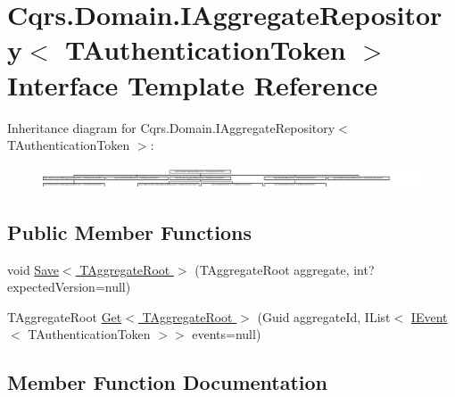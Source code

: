 \hypertarget{interfaceCqrs_1_1Domain_1_1IAggregateRepository}{}\section{Cqrs.\+Domain.\+I\+Aggregate\+Repository$<$ T\+Authentication\+Token $>$ Interface Template Reference}
\label{interfaceCqrs_1_1Domain_1_1IAggregateRepository}
Inheritance diagram for Cqrs.\+Domain.\+I\+Aggregate\+Repository$<$ T\+Authentication\+Token $>$\+:\begin{figure}[H]
\begin{center}
\leavevmode
\includegraphics[height=0.661939cm]{interfaceCqrs_1_1Domain_1_1IAggregateRepository}
\end{center}
\end{figure}
\subsection*{Public Member Functions}
\begin{DoxyCompactItemize}
\item 
void \hyperlink{interfaceCqrs_1_1Domain_1_1IAggregateRepository_a306baf8aa6faabe893f93e5db5d3517d_a306baf8aa6faabe893f93e5db5d3517d}{Save$<$ T\+Aggregate\+Root $>$} (T\+Aggregate\+Root aggregate, int? expected\+Version=null)
\item 
T\+Aggregate\+Root \hyperlink{interfaceCqrs_1_1Domain_1_1IAggregateRepository_a890633fddbd05bd3b9e9968a2de095bb_a890633fddbd05bd3b9e9968a2de095bb}{Get$<$ T\+Aggregate\+Root $>$} (Guid aggregate\+Id, I\+List$<$ \hyperlink{interfaceCqrs_1_1Events_1_1IEvent}{I\+Event}$<$ T\+Authentication\+Token $>$$>$ events=null)
\end{DoxyCompactItemize}


\subsection{Member Function Documentation}
\mbox{\label{interfaceCqrs_1_1Domain_1_1IAggregateRepository_a890633fddbd05bd3b9e9968a2de095bb_a890633fddbd05bd3b9e9968a2de095bb}} 
